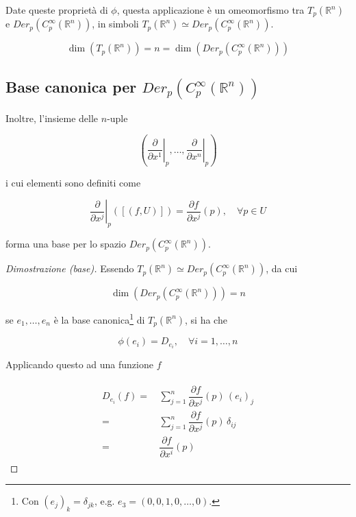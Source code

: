 Date queste proprietà di $ \phi $, questa applicazione è un omeomorfismo tra $ T_{p}(\mathbb{R}^{n}) $ e $ Der_{p}(C_{p}^{\infty}(\mathbb{R}^{n})) $, in simboli $ T_{p}(\mathbb{R}^{n}) \simeq Der_{p}(C_{p}^{\infty}(\mathbb{R}^{n})) $.

\begin{corollary}
	\begin{equation}
		\dim ( T_{p}(\mathbb{R}^{n}) ) = n = \dim ( Der_{p}(C_{p}^{\infty}(\mathbb{R}^{n})) )
	\end{equation}
\end{corollary}

\subsection{Base canonica per $ Der_{p}(C_{p}^{\infty}(\mathbb{R}^{n})) $}

Inoltre, l'insieme delle $ n $-uple

\begin{equation}
	\left( \left. \dfrac{\partial}{\partial x^{1}} \right|_{p},\dots,\left. \dfrac{\partial}{\partial x^{n}} \right|_{p} \right)
\end{equation}

i cui elementi sono definiti come

\begin{equation}
	\left. \dfrac{\partial}{\partial x^{j}} \right|_{p} ([(f,U)]) = \dfrac{\partial f}{\partial x^{j}} (p), \quad \forall p \in U
\end{equation}

forma una base per lo spazio $ Der_{p}(C_{p}^{\infty}(\mathbb{R}^{n})) $.

\begin{proof}[Dimostrazione (base)]
	Essendo $ T_{p}(\mathbb{R}^{n}) \simeq Der_{p}(C_{p}^{\infty}(\mathbb{R}^{n})) $, da cui
	
	\begin{equation}
		\dim ( Der_{p}(C_{p}^{\infty}(\mathbb{R}^{n})) ) = n
	\end{equation}
		
	se $ e_{1},\dots,e_{n} $ è la base canonica\footnote{%
		Con $ (e_{j})_{k} = \delta_{jk} $, e.g. $ e_{3} = (0,0,1,0,\dots,0) $.%
	} di $ T_{p}(\mathbb{R}^{n}) $, si ha che

	\begin{equation}
		\phi(e_{i}) = D_{e_{i}}, \quad \forall i=1,\dots,n
	\end{equation}

	Applicando questo ad una funzione $ f $
	
	\begin{align}
		\begin{split}
			D_{e_{i}} (f) =& \, \sum_{j=1}^{n} \dfrac{\partial f}{\partial x^{j}} (p) \, (e_{i})_{j}\\
			=& \, \sum_{j=1}^{n} \dfrac{\partial f}{\partial x^{j}} (p) \, \delta_{ij}\\
			=& \, \dfrac{\partial f}{\partial x^{i}} (p)
		\end{split}
	\end{align}
\end{proof}

